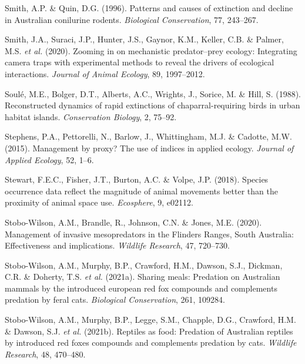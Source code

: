 \documentclass[11pt,a4paper,titlepage,twoside,openright]{style/unimelbthesis}
\begin{document}
\begin{mainmatter}
\leavevmode\hypertarget{ref-smith1996patterns}{}%
Smith, A.P. \& Quin, D.G. (1996). Patterns and causes of extinction and decline in Australian conilurine rodents. \emph{Biological Conservation}, 77, 243--267.

\leavevmode\hypertarget{ref-smith2020zooming}{}%
Smith, J.A., Suraci, J.P., Hunter, J.S., Gaynor, K.M., Keller, C.B. \& Palmer, M.S. \emph{et al.} (2020). Zooming in on mechanistic predator--prey ecology: Integrating camera traps with experimental methods to reveal the drivers of ecological interactions. \emph{Journal of Animal Ecology}, 89, 1997--2012.

\leavevmode\hypertarget{ref-soule1988reconstructed}{}%
Soulé, M.E., Bolger, D.T., Alberts, A.C., Wrights, J., Sorice, M. \& Hill, S. (1988). Reconstructed dynamics of rapid extinctions of chaparral-requiring birds in urban habitat islands. \emph{Conservation Biology}, 2, 75--92.

\leavevmode\hypertarget{ref-stephens2015management}{}%
Stephens, P.A., Pettorelli, N., Barlow, J., Whittingham, M.J. \& Cadotte, M.W. (2015). Management by proxy? The use of indices in applied ecology. \emph{Journal of Applied Ecology}, 52, 1--6.

\leavevmode\hypertarget{ref-stewart2018species}{}%
Stewart, F.E.C., Fisher, J.T., Burton, A.C. \& Volpe, J.P. (2018). Species occurrence data reflect the magnitude of animal movements better than the proximity of animal space use. \emph{Ecosphere}, 9, e02112.

\leavevmode\hypertarget{ref-stobo2020management}{}%
Stobo-Wilson, A.M., Brandle, R., Johnson, C.N. \& Jones, M.E. (2020). Management of invasive mesopredators in the Flinders Ranges, South Australia: Effectiveness and implications. \emph{Wildlife Research}, 47, 720--730.

\leavevmode\hypertarget{ref-stobo2021sharing}{}%
Stobo-Wilson, A.M., Murphy, B.P., Crawford, H.M., Dawson, S.J., Dickman, C.R. \& Doherty, T.S. \emph{et al.} (2021a). Sharing meals: Predation on Australian mammals by the introduced european red fox compounds and complements predation by feral cats. \emph{Biological Conservation}, 261, 109284.

\leavevmode\hypertarget{ref-stobo2021reptiles}{}%
Stobo-Wilson, A.M., Murphy, B.P., Legge, S.M., Chapple, D.G., Crawford, H.M. \& Dawson, S.J. \emph{et al.} (2021b). Reptiles as food: Predation of Australian reptiles by introduced red foxes compounds and complements predation by cats. \emph{Wildlife Research}, 48, 470--480.


\end{mainmatter}
\end{document}
